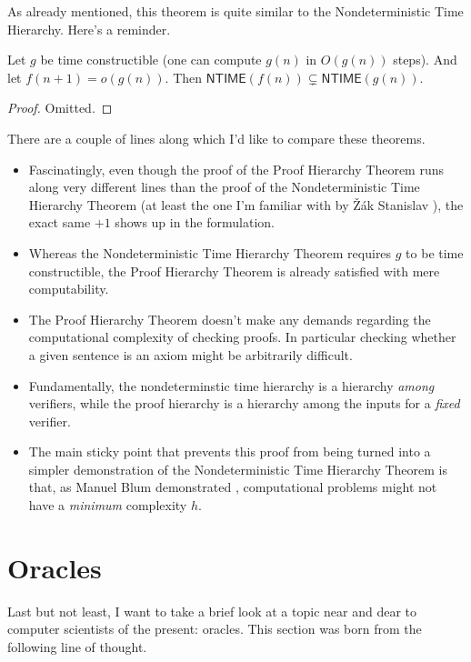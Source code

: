 \documentclass{article}
\theoremstyle{customstyle}
\newenvironment{prf}{\begin{mdframed}[skipabove=5pt, backgroundcolor=Gray!10, topline=false, bottomline=false, leftline=false, rightline=false]\begin{proof}}{\end{proof}\end{mdframed}}
\begin{document}
As already mentioned, this theorem is quite similar to the Nondeterministic Time Hierarchy. Here's a reminder.

\begin{theorem}
  Let $g$ be time constructible (one can compute $g(n)$ in $O(g(n))$ steps). And let $f(n+1) = o(g(n))$. Then $\mathsf{NTIME}(f(n)) \subsetneq \mathsf{NTIME}(g(n))$.
\end{theorem}

\begin{prf}
  Omitted.
\end{prf}

There are a couple of lines along which I'd like to compare these theorems.

\begin{itemize}
  \item Fascinatingly, even though the proof of the Proof Hierarchy Theorem runs along very different lines than the proof of the Nondeterministic Time Hierarchy Theorem (at least the one I'm familiar with by \v{Z}ák Stanislav \cite{stanislav}), the exact same $+1$ shows up in the formulation.
  \item Whereas the Nondeterministic Time Hierarchy Theorem requires $g$ to be time constructible, the Proof Hierarchy Theorem is already satisfied with mere computability.
  \item The Proof Hierarchy Theorem doesn't make any demands regarding the computational complexity of checking proofs. In particular checking whether a given sentence is an axiom might be arbitrarily difficult.
  \item Fundamentally, the nondeterminstic time hierarchy is a hierarchy \emph{among} verifiers, while the proof hierarchy is a hierarchy among the inputs for a \emph{fixed} verifier.
  \item The main sticky point that prevents this proof from being turned into a simpler demonstration of the Nondeterministic Time Hierarchy Theorem is that, as Manuel Blum demonstrated \cite{blum}, computational problems might not have a \emph{minimum} complexity $h$.
\end{itemize}

\section{Oracles}

Last but not least, I want to take a brief look at a topic near and dear to computer scientists of the present: oracles. This section was born from the following line of thought.
\end{document}
